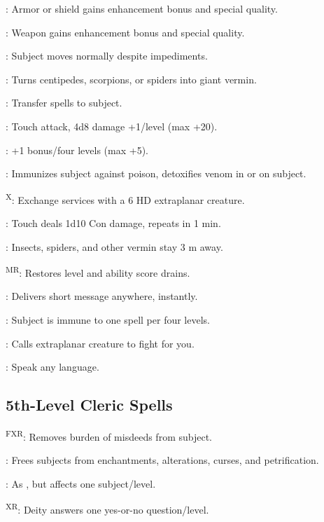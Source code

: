 : Armor or shield gains enhancement bonus and special quality. %

: Weapon gains enhancement bonus and special quality. %

: Subject moves normally despite impediments.

: Turns centipedes, scorpions, or spiders into giant vermin.

: Transfer spells to subject.

: Touch attack, 4d8 damage +1/level (max +20).

: +1 bonus/four levels (max +5).

: Immunizes subject against poison, detoxifies venom in or on subject.

\textsuperscript{X}: Exchange services with a 6 HD extraplanar creature.

: Touch deals 1d10 Con damage, repeats in 1 min.

: Insects, spiders, and other vermin stay 3 m away.

\textsuperscript{MR}: Restores level and ability score drains.

: Delivers short message anywhere, instantly.

: Subject is immune to one spell per four levels.

: Calls extraplanar creature to fight for you.

: Speak any language.



\subsection{5th-Level Cleric Spells}

\textsuperscript{FXR}: Removes burden of misdeeds from subject.

: Frees subjects from enchantments, alterations, curses, and petrification.

: As , but affects one subject/level.

\textsuperscript{XR}: Deity answers one yes-or-no question/level.

